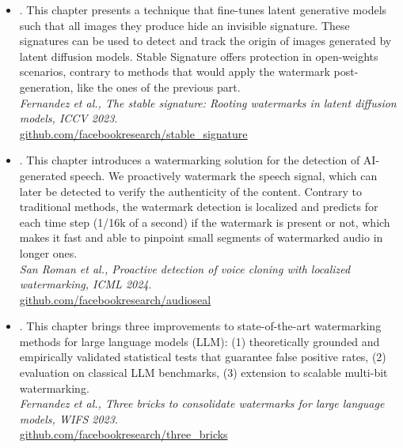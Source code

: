 \begin{itemize}
    \item {}.
        This chapter presents a technique that fine-tunes latent generative models such that all images they produce hide an invisible signature. 
        These signatures can be used to detect and track the origin of images generated by latent diffusion models.
        Stable Signature offers protection in open-weights scenarios, contrary to methods that would apply the watermark post-generation, like the ones of the previous part.
        \\ \basedon
        \textit{Fernandez et al., The stable signature: Rooting watermarks in latent diffusion models, ICCV 2023}.
        \\ \codeat
        \url{github.com/facebookresearch/stable_signature}
    \item {}.
        This chapter introduces a watermarking solution for the detection of AI-generated speech.
        We proactively watermark the speech signal, which can later be detected to verify the authenticity of the content. 
        Contrary to traditional methods, the watermark detection is localized and predicts for each time step (1/16k of a second) if the watermark is present or not, which makes it fast and able to pinpoint small segments of watermarked audio in longer ones.
        \\ \basedon
        \textit{San Roman et al., Proactive detection of voice cloning with localized watermarking, ICML 2024}.
        \\ \codeat
        \url{github.com/facebookresearch/audioseal}
    \item {}.
        This chapter brings three improvements to state-of-the-art watermarking methods for large language models (LLM):
        (1) theoretically grounded and empirically validated statistical tests that guarantee false positive rates,
        (2) evaluation on classical LLM benchmarks,
        (3) extension to scalable multi-bit watermarking.
        \\ \basedon
        \textit{Fernandez et al., Three bricks to consolidate watermarks for large language models, WIFS 2023}.
        \\ \codeat
        \url{github.com/facebookresearch/three_bricks}
\end{itemize}

\noindent
{} 

